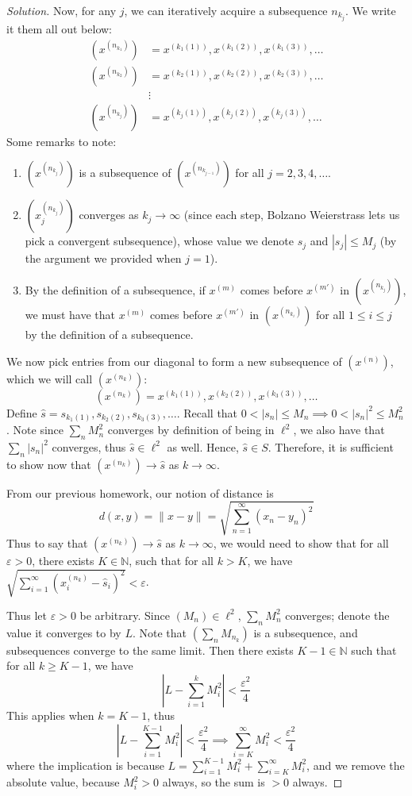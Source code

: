 \documentclass{article}
\newcommand{\N}{{\mathbb N}}
\newcommand{\ep}{{\varepsilon}}
\begin{document}
\begin{proof}[Solution]
	Now, for any $j$, we can iteratively acquire a subsequence $n_{k_j}$.
	We write it them all out below:
	\begin{align*}
		\left(x^{(n_{k_1})}\right) &= x^{(k_1(1))}, x^{(k_1(2))}, x^{(k_1(3))}, \dots\\
		\left(x^{(n_{k_2})}\right) &= x^{(k_2(1))}, x^{(k_2(2))}, x^{(k_2(3))}, \dots\\
						&\vdots\\
		\left(x^{(n_{k_j})}\right) &= x^{(k_j(1))}, x^{(k_j(2))}, x^{(k_j(3))}, \dots
	\end{align*}
	Some remarks to note:
	\begin{enumerate}
		\item $\left(x^{(n_{k_j})}\right)$ is a subsequence of
			$\left(x^{(n_{k_{j-1}})}\right)$ for all $j = 2,3,4,\dots$.
		\item $\left(x_j^{(n_{k_j})}\right)$ converges as $k_j \to \infty$
		(since each step, Bolzano Weierstrass lets us pick a convergent subsequence),
		whose value we denote $s_j$ and $|s_j| \leq M_j$
		(by the argument we provided when $j=1$).
		\item By the definition of a subsequence,
			if $x^{(m)}$ comes before $x^{(m')}$ in $\left(x^{(n_{k_j})}\right)$,
			we must have that $x^{(m)}$ comes before $x^{(m')}$ in
			$\left(x^{(n_{k_i})}\right)$ for all $1 \leq i \leq j$
			by the definition of a subsequence.
	\end{enumerate}
	We now pick entries from our diagonal to form a new subsequence of
	$\left(x^{(n)}\right)$, which we will call $\left(x^{(n_k)}\right)$:
	\[
		\left(x^{(n_k)}\right) = x^{(k_1(1))}, x^{(k_2(2))}, x^{(k_3(3))}, \dots
	\]
	Define $\hat{s} = s_{k_1(1)}, s_{k_2(2)}, s_{k_3(3)}, \dots$.
	Recall that $0 < |s_n| \leq M_n \implies 0 < |s_n|^2 \leq M_n^2$.
	Note since $\sum_n M_n^2$ converges by definition of being in $\ell^2$,
	we also have that $\sum_n |s_n|^2$ converges,
	thus $\hat{s} \in \ell^2$ as well.
	Hence, $\hat{s} \in S$.
	Therefore, it is sufficient to show now that
	$\left(x^{(n_k)}\right) \to \hat{s}$ as $k \to \infty$.

	From our previous homework, our notion of distance is
	\[
		d(x,y) = \lVert x - y\rVert = \sqrt{\sum_{n=1}^\infty (x_n-y_n)^2}
	\]
	Thus to say that $\left(x^{(n_k)}\right) \to \hat{s}$ as $k \to \infty$,
	we would need to show that for all $\ep > 0$, there exists $K\in\N$,
	such that for all $k > K$, we have
	$\sqrt{\sum_{i=1}^\infty (x^{(n_k)}_i-\hat{s}_i)^2} < \ep$.

	Thus let $\ep > 0$ be arbitrary.
	Since $(M_n) \in \ell^2$, $\sum_n M_n^2$ converges;
	denote the value it converges to by $L$.
	Note that $(\sum_n M_{n_k})$ is a subsequence,
	and subsequences converge to the same limit.
	Then there exists $K-1 \in \N$ such that for all $k \geq K-1$, we have
	\[
		\left\lvert L - \sum_{i=1}^k M_i^2\right\rvert < \frac{\ep^2}{4}
	\]
	This applies when $k = K-1$, thus
	\[
		\left\lvert  L - \sum_{i=1}^{K-1} M_i^2\right\rvert
		< \frac{\ep^2}{4} \implies \sum_{i=K}^\infty M_i^2 < \frac{\ep^2}{4}
	\]
	where the implication is because $L = \sum_{i=1}^{K-1} M_i^2 + \sum_{i=K}^\infty M_i^2$,
	and we remove the absolute value, because $M_i^2 > 0$ always,
	so the sum is $>0$ always.


\end{proof}
\end{document}
